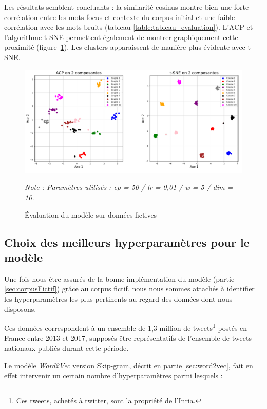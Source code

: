 \documentclass[11pt,french,french]{article}
\let\rmarkdownfootnote\footnote%
\def\footnote{\protect\rmarkdownfootnote}
\begin{document}
Les résultats semblent concluants : la similarité cosinus montre bien
une forte corrélation entre les mots focus et contexte du corpus initial
et une faible corrélation avec les mots bruits (tableau
\ref{table:tableau_evaluation}). L'ACP et l'algorithme t-SNE permettent
également de montrer graphiquement cette proximité
(figure~\ref{fig:figure_evaluation}). Les clusters apparaissent de
manière plus évidente avec t-SNE.

\begin{figure}
\begin{center}
\includegraphics[width=1\textwidth]{img/figures.png}
\captionsetup{margin=0cm,format=hang,justification=justified}
\caption{Évaluation du modèle sur données fictives}\label{fig:figure_evaluation}
\end{center}
\vspace{-0.3cm}
\footnotesize
\emph{Note : Paramètres utilisés : ep = 50 / lr = 0,01 / w = 5 / dim = 10.}
\end{figure}

\subsection{Choix des meilleurs hyperparamètres pour le
modèle}\label{sec:hyperparametres}

Une fois nous être assurés de la bonne implémentation du modèle (partie
\ref{sec:corpusFictif}) grâce au corpus fictif, nous nous sommes
attachés à identifier les hyperparamètres les plus pertinents au regard
des données dont nous disposons.

Ces données correspondent à un ensemble de 1,3 million de
tweets\footnote{Ces tweets, achetés à twitter, sont la propriété de
  l'Inria.} postés en France entre 2013 et 2017, supposés être
représentatifs de l'ensemble de tweets nationaux publiés durant cette
période.

Le modèle \emph{Word2Vec} version Skip-gram, décrit en partie
\ref{sec:word2vec}, fait en effet intervenir un certain nombre
d'hyperparamètres parmi lesquels :
\end{document}
